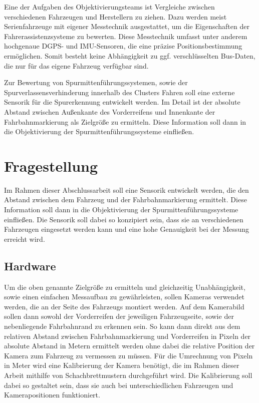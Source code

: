         Eine der Aufgaben des Objektivierungsteams ist Vergleiche zwischen verschiedenen Fahrzeugen und Herstellern zu ziehen. Dazu werden meist Serienfahrzeuge mit eigener Messtechnik ausgestattet, um die Eigenschaften der Fahrerassistenzsysteme zu bewerten. Diese Messtechnik umfasst unter anderem hochgenaue DGPS- und IMU-Sensoren, die eine präzise Positionsbestimmung ermöglichen.
        Somit besteht keine Abhängigkeit zu ggf. verschlüsselten Bus-Daten, die nur für das eigene Fahrzeug verfügbar sind.

        Zur Bewertung von Spurmittenführungssystemen, sowie der Spurverlassensverhinderung innerhalb des Clusters Fahren soll eine externe Sensorik für die Spurerkennung entwickelt werden. Im Detail ist der absolute Abstand zwischen Außenkante des Vorderreifens und Innenkante der Fahrbahnmarkierung als Zielgröße zu ermitteln. Diese Information soll dann in die Objektivierung der Spurmittenführungssysteme einfließen.
    
    \section{Fragestellung}
        Im Rahmen dieser Abschlussarbeit soll eine Sensorik entwickelt werden, die den Abstand zwischen dem Fahrzeug und der Fahrbahnmarkierung ermittelt. Diese Information soll dann in die Objektivierung der Spurmittenführungssysteme einfließen. Die Sensorik soll dabei so konzipiert sein, dass sie an verschiedenen Fahrzeugen eingesetzt werden kann und eine hohe Genauigkeit bei der Messung erreicht wird.
        
        \subsection{Hardware}
        Um die oben genannte Zielgröße zu ermitteln und gleichzeitig Unabhängigkeit, sowie einen einfachen Messaufbau zu gewährleisten, sollen Kameras verwendet werden, die an der Seite des Fahrzeugs montiert werden. Auf dem Kamerabild sollen dann sowohl der Vorderreifen der jeweiligen Fahrzeugseite, sowie der nebenliegende Fahrbahnrand zu erkennen sein.
        So kann dann direkt aus dem relativen Abstand zwischen Fahrbahnmarkierung und Vorderreifen in Pixeln der absolute Abstand in Metern ermittelt werden ohne dabei die relative Position der Kamera zum Fahrzeug zu vermessen zu müssen.
        Für die Umrechnung von Pixeln in Meter wird eine Kalibrierung der Kamera benötigt, die im Rahmen dieser Arbeit mithilfe von Schachbrettmustern durchgeführt wird. Die Kalibrierung soll dabei so gestaltet sein, dass sie auch bei unterschiedlichen Fahrzeugen und Kamerapositionen funktioniert.


